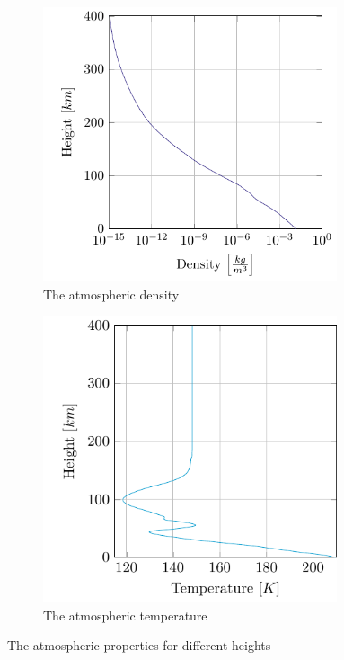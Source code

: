 \begin{figure}[h]
	\centering
	\begin{subfigure}{0.48\textwidth}
		\centering
		\includegraphics[width=0.95\textwidth]{Figure/Atmosphere/rho_h_180_0.pdf}
		\caption{The atmospheric density} 
		\label{fig:atmos_height_rho}
	\end{subfigure}
	\begin{subfigure}{0.48\textwidth}
		\centering
		\includegraphics[width=0.95\textwidth]{Figure/Atmosphere/T_h_180_0.pdf}
		\caption{The atmospheric temperature}
		\label{fig:atmos_height_T}
	\end{subfigure}
	\caption{The atmospheric properties for different heights}
	\label{fig:atmos_height}
\end{figure}

